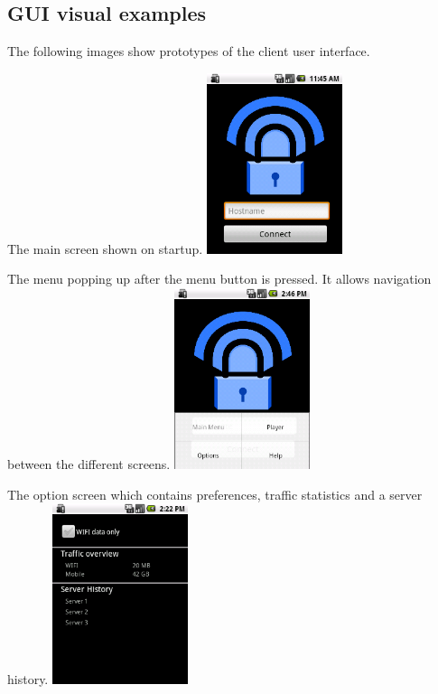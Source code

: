 \documentclass[a4paper,10pt]{scrartcl}
\begin{document}
\subsection{GUI visual examples}
The following images show prototypes of the client user interface.

\begin{illustration}{The main screen shown on startup.}
\includegraphics[width=150px]{figures/images/mainscreen.png}
\end{illustration}
\begin{illustration}{The menu popping up after the menu button is pressed.
   It allows navigation between the different screens.}
\includegraphics[width=150px]{figures/images/menu.png}
\end{illustration}
\begin{illustration}{The option screen which contains preferences, traffic statistics and a server history.}
\includegraphics[width=150px]{figures/images/optionscreen.png}
\end{illustration}
\end{document}
